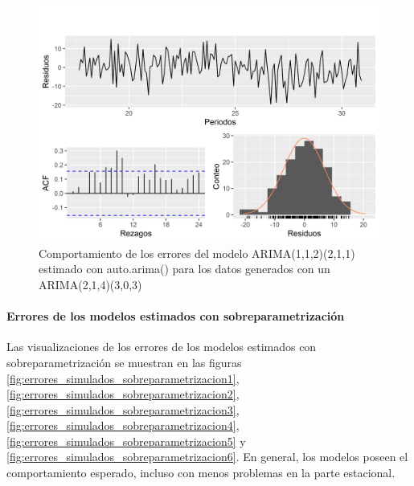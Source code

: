 \documentclass[
]{article}
\begin{document}
\begin{figure}[H]
\includegraphics[width=1\linewidth,height=1\textheight]{Tesis_files/figure-latex/errores_simulados_autoarima6-1} \caption{Comportamiento de los errores del modelo ARIMA(1,1,2)(2,1,1) estimado con auto.arima() para los datos generados con un ARIMA(2,1,4)(3,0,3)}\label{fig:errores_simulados_autoarima6}
\end{figure}

\paragraph{Errores de los modelos estimados con sobreparametrización}

Las visualizaciones de los errores de los modelos estimados con
sobreparametrización se muestran en las figuras
\ref{fig:errores_simulados_sobreparametrizacion1},
\ref{fig:errores_simulados_sobreparametrizacion2},
\ref{fig:errores_simulados_sobreparametrizacion3},
\ref{fig:errores_simulados_sobreparametrizacion4},
\ref{fig:errores_simulados_sobreparametrizacion5} y
\ref{fig:errores_simulados_sobreparametrizacion6}. En general, los
modelos poseen el comportamiento esperado, incluso con menos problemas
en la parte estacional.
\end{document}
